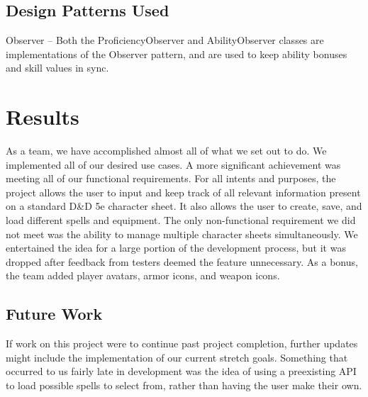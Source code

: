 \documentclass[10pt,conference,onecolumn,compsoc]{IEEEtran}
\begin{document}
\subsection{Design Patterns Used}
Observer -- Both the ProficiencyObserver and AbilityObserver classes are implementations of the Observer pattern, and are used to keep ability bonuses and skill values in sync.

\section{Results}
As a team, we have accomplished almost all of what we set out to do. We implemented all of our desired use cases. A more significant achievement was meeting all of our functional requirements. For all intents and purposes, the project allows the user to input and keep track of all relevant information present on a standard D\&D 5e character sheet. It also allows the user to create, save, and load different spells and equipment. The only non-functional requirement we did not meet was the ability to manage multiple character sheets simultaneously. We entertained the idea for a large portion of the development process, but it was dropped after feedback from testers deemed the feature unnecessary. As a bonus, the team added player avatars, armor icons, and weapon icons. 

\subsection{Future Work}
If work on this project were to continue past project completion, further updates might include the implementation of our current stretch goals. Something that occurred to us fairly late in development was the idea of using a preexisting API to load possible spells to select from, rather than having the user make their own. 

\end{document}
